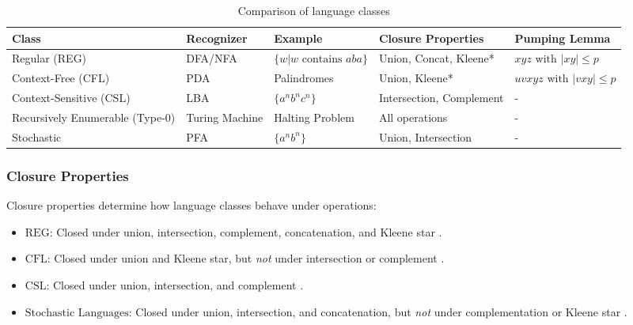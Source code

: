 \begin{table}[h]
    \centering
    \begin{adjustbox}{max width=\textwidth}
    \begin{tabular}{@{}lllll@{}}
        \toprule
        \textbf{Class} & \textbf{Recognizer} & \textbf{Example} & \textbf{Closure Properties} & \textbf{Pumping Lemma} \\ \midrule
        Regular (REG) & DFA/NFA & $\{w | w \text{ contains } aba\}$ & Union, Concat, Kleene* & $xyz \text{ with } |xy| \leq p$ \\
        Context-Free (CFL) & PDA & Palindromes & Union, Kleene* & $uvxyz \text{ with } |vxy| \leq p$ \\
        Context-Sensitive (CSL) & LBA & $\{a^n b^n c^n\}$ & Intersection, Complement & - \\
        Recursively Enumerable (Type-0) & Turing Machine & Halting Problem & All operations & - \\
        Stochastic & PFA & $\{a^n b^n\}$ & Union, Intersection & - \\ %
        \bottomrule
    \end{tabular}
    \end{adjustbox}
    \caption{Comparison of language classes}
    \label{tab:language-comparison}
\end{table}

\subsubsection{Closure Properties}
Closure properties determine how language classes behave under operations:  

\begin{itemize}
    \item $\text{REG}$: Closed under union, intersection, complement, concatenation, and Kleene star \cite{hopcroft2006introduction}.  
    \item $\text{CFL}$: Closed under union and Kleene star, but \textit{not} under intersection or complement \cite{chomsky1956three, hopcroft2006introduction}.  
    \item $\text{CSL}$: Closed under union, intersection, and complement \cite{chomsky1956three, hopcroft2006introduction}.  
    \item $\text{Stochastic Languages}$: Closed under union, intersection, and concatenation, but \textit{not} under complementation or Kleene star \cite{rabin1963probabilistic, paz1971introduction}.  
\end{itemize}

